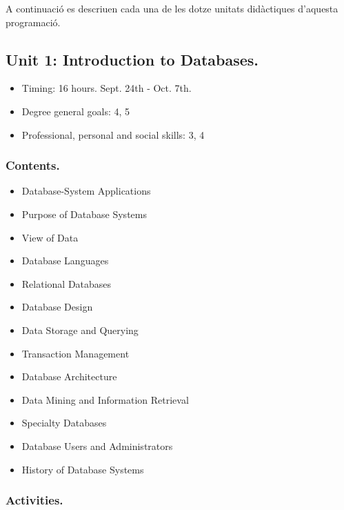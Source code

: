 \documentclass[catalan, a4paper, 12pt, titlepage]{article}
\begin{document}
A continuació es descriuen cada una de les dotze unitats didàctiques d'aquesta programació.

  \subsection{Unit 1: Introduction to Databases.}

  \begin{itemize}
	\item Timing: 16 hours. Sept. 24th - Oct. 7th.
	\item Degree general goals: 4, 5
	\item Professional, personal and social skills: 3, 4
  \end{itemize}

  
  \subsubsection{Contents.}

  \begin{itemize}
	  \item Database-System Applications
	  \item Purpose of Database Systems
	  \item View of Data
	  \item Database Languages
	  \item Relational Databases
	  \item Database Design
	  \item Data Storage and Querying
	  \item Transaction Management
	  \item Database Architecture
	  \item Data Mining and Information Retrieval
	  \item Specialty Databases
	  \item Database Users and Administrators
	  \item History of Database Systems
  \end{itemize}
  
  \subsubsection{Activities.}
\end{document}
